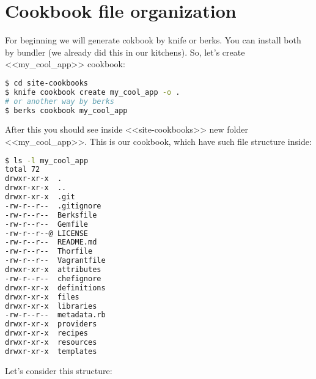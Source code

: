 \section{Cookbook file organization}

For beginning we will generate cokbook by knife or berks. You can install both by bundler (we already did this in our kitchens). So, let's create <<my\_cool\_app>> cookbook:

\begin{lstlisting}[language=Bash,label=lst:cookbook-organization1]
$ cd site-cookbooks
$ knife cookbook create my_cool_app -o .
# or another way by berks
$ berks cookbook my_cool_app
\end{lstlisting}

After this you should see inside <<site-cookbooks>> new folder <<my\_cool\_app>>. This is our cookbook, which have such file structure inside:

\begin{lstlisting}[language=Bash,label=lst:cookbook-organization2]
$ ls -l my_cool_app
total 72
drwxr-xr-x  .
drwxr-xr-x  ..
drwxr-xr-x  .git
-rw-r--r--  .gitignore
-rw-r--r--  Berksfile
-rw-r--r--  Gemfile
-rw-r--r--@ LICENSE
-rw-r--r--  README.md
-rw-r--r--  Thorfile
-rw-r--r--  Vagrantfile
drwxr-xr-x  attributes
-rw-r--r--  chefignore
drwxr-xr-x  definitions
drwxr-xr-x  files
drwxr-xr-x  libraries
-rw-r--r--  metadata.rb
drwxr-xr-x  providers
drwxr-xr-x  recipes
drwxr-xr-x  resources
drwxr-xr-x  templates
\end{lstlisting}

Let's consider this structure:

